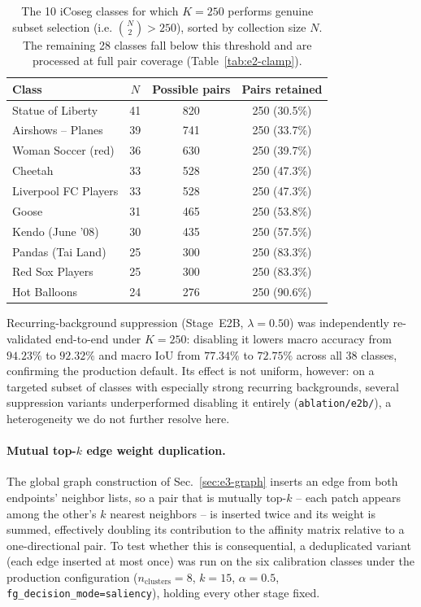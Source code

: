\begin{table}[t]
\centering
\caption{The 10 iCoseg classes for which $K=250$ performs genuine
subset selection (i.e. $\binom{N}{2} > 250$), sorted by collection
size $N$. The remaining 28 classes fall below this threshold and are
processed at full pair coverage (Table~\ref{tab:e2-clamp}).}
\label{tab:e2-clamp-detail}
\begin{tabular}{@{}lccc@{}}
\toprule
\textbf{Class} & \textbf{$N$} & \textbf{Possible pairs} & \textbf{Pairs retained} \\
\midrule
Statue of Liberty      & 41 & 820 & 250 (30.5\%) \\
Airshows -- Planes     & 39 & 741 & 250 (33.7\%) \\
Woman Soccer (red)     & 36 & 630 & 250 (39.7\%) \\
Cheetah                & 33 & 528 & 250 (47.3\%) \\
Liverpool FC Players   & 33 & 528 & 250 (47.3\%) \\
Goose                  & 31 & 465 & 250 (53.8\%) \\
Kendo (June '08)       & 30 & 435 & 250 (57.5\%) \\
Pandas (Tai Land)      & 25 & 300 & 250 (83.3\%) \\
Red Sox Players        & 25 & 300 & 250 (83.3\%) \\
Hot Balloons           & 24 & 276 & 250 (90.6\%) \\
\bottomrule
\end{tabular}
\end{table}

Recurring-background suppression (Stage~E2B, $\lambda=0.50$) was
independently re-validated end-to-end under $K=250$: disabling it
lowers macro accuracy from $94.23\%$ to $92.32\%$ and macro IoU from
$77.34\%$ to $72.75\%$ across all 38 classes, confirming the production
default. Its effect is not uniform, however: on a targeted subset of
classes with especially strong recurring backgrounds, several
suppression variants underperformed disabling it entirely
(\texttt{ablation/e2b/}), a heterogeneity we do not further resolve
here.

\paragraph{Mutual top-$k$ edge weight duplication.}
The global graph construction of Sec.~\ref{sec:e3-graph} inserts an edge from both endpoints' neighbor lists, so a pair that is mutually top-$k$ -- each patch appears among the other's $k$ nearest neighbors -- is inserted twice and its weight is summed, effectively doubling its contribution to the affinity matrix relative to a one-directional pair. To test whether this is consequential, a deduplicated variant (each edge inserted at most once) was run on the six calibration classes under the production configuration ($n_{\text{clusters}}=8$, $k=15$, $\alpha=0.5$, \texttt{fg\_decision\_mode=saliency}), holding every other stage fixed.

